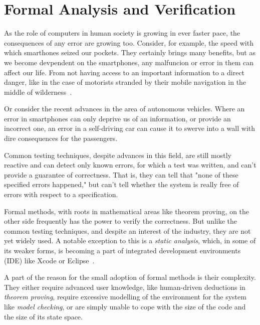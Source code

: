 
\chapter{Formal Analysis and Verification} \label{chap:fav}
As the role of computers in human society is growing in ever faster pace, the consequences of any error are growing too. Consider, for example, the speed with which smarthones seized our pockets. They certainly brings many benefits, but as we become devpendent on the smartphones, any malfuncion or error in them can affect our life. From not having access to an important information to a direct danger, like in the case of motorists stranded by their mobile navigation in the middle of wilderness~\cite{appleMaps}.

Or consider the recent advances in the area of autonomous vehicles. Where an error in smartphones can only deprive us of an information, or provide an incorrect one, an error in a self-driving car can cause it to swerve into a wall with dire consequences for the passengers.

Common testing techniques, despite advances in this field, are still mostly reactive and can detect only known errors, for which a test was written, and can't provide a guarantee of correctness. That is, they can tell that "none of these specified errors happened," but can't tell whether the system is really free of errors with respect to a specification.

Formal methods, with roots in mathematical areas like theorem proving, on the other side frequently has the power to verify the correctness. But unlike the common testing techniques, and despite an interest of the industry, they are not yet widely used. A notable exception to this is a {\em static analysis}, which, in some of its weaker forms, is becoming a part of integrated development environments (IDE) like Xcode or Eclipse~\cite{xcodeAnalysis}.

A part of the reason for the small adoption of formal methods is their complexity. They either require advanced user knowledge, like human-driven deductions in {\em theorem proving}, require excessive modelling of the environment for the system like {\em model checking}, or are simply unable to cope with the size of the code and the size of its state space.

